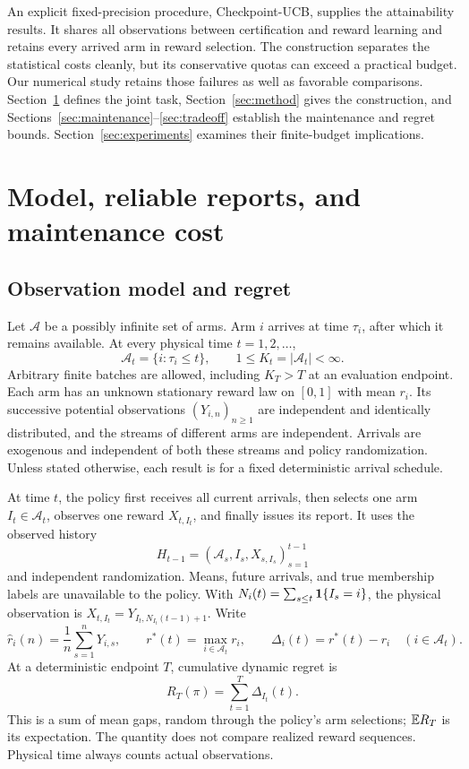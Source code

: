 \documentclass[11pt]{article}
\begin{document}
An explicit fixed-precision procedure, Checkpoint-UCB, supplies the
attainability results. It shares all observations between certification
and reward learning and retains every arrived arm in reward selection.
The construction separates the statistical costs cleanly, but its
conservative quotas can exceed a practical budget. Our numerical study
retains those failures as well as favorable comparisons. Section~\ref{sec:model}
defines the joint task, Section~\ref{sec:method} gives the construction,
and Sections~\ref{sec:maintenance}--\ref{sec:tradeoff} establish the
maintenance and regret bounds. Section~\ref{sec:experiments} examines their
finite-budget implications.

\section{Model, reliable reports, and maintenance cost}
\label{sec:model}
\label{sec:problem}

\subsection{Observation model and regret}

Let $\mathcal A$ be a possibly infinite set of arms. Arm $i$ arrives at
time $\tau_i$, after which it remains available. At every physical time
$t=1,2,\ldots$,
\[
 \mathcal A_t=\{i:\tau_i\le t\},\qquad
 1\le K_t=|\mathcal A_t|<\infty.
\]
Arbitrary finite batches are allowed, including $K_T>T$ at an evaluation
endpoint. Each arm has an unknown stationary reward law on $[0,1]$ with
mean $r_i$. Its successive potential observations $(Y_{i,n})_{n\ge1}$ are
independent and identically distributed, and the streams of different arms
are independent. Arrivals are exogenous and independent of both these
streams and policy randomization. Unless stated otherwise, each result
is for a fixed deterministic arrival schedule.

At time $t$, the policy first receives all current arrivals, then selects
one arm $I_t\in\mathcal A_t$, observes one reward $X_{t,I_t}$, and finally
issues its report. It uses the observed history
\[
 H_{t-1}=(\mathcal A_s,I_s,X_{s,I_s})_{s=1}^{t-1}
\]
and independent randomization. Means, future arrivals, and true membership
labels are unavailable to the policy. With
$N_i(t)=\sum_{s\le t}\mathbf 1\{I_s=i\}$, the physical observation is
$X_{t,I_t}=Y_{I_t,N_{I_t}(t-1)+1}$. Write
\[
 \hat r_i(n)=\frac1n\sum_{s=1}^nY_{i,s},\qquad
 r^*(t)=\max_{i\in\mathcal A_t}r_i,\qquad
 \Delta_i(t)=r^*(t)-r_i \quad(i\in\mathcal A_t).
\]
At a deterministic endpoint $T$, cumulative dynamic regret is
\[
 R_T(\pi)=\sum_{t=1}^{T}\Delta_{I_t}(t).
\]
This is a sum of mean gaps, random through the policy's arm selections;
$\mathbb E R_T$ is its expectation. The quantity does not compare realized
reward sequences. Physical time always counts actual observations.
\end{document}
